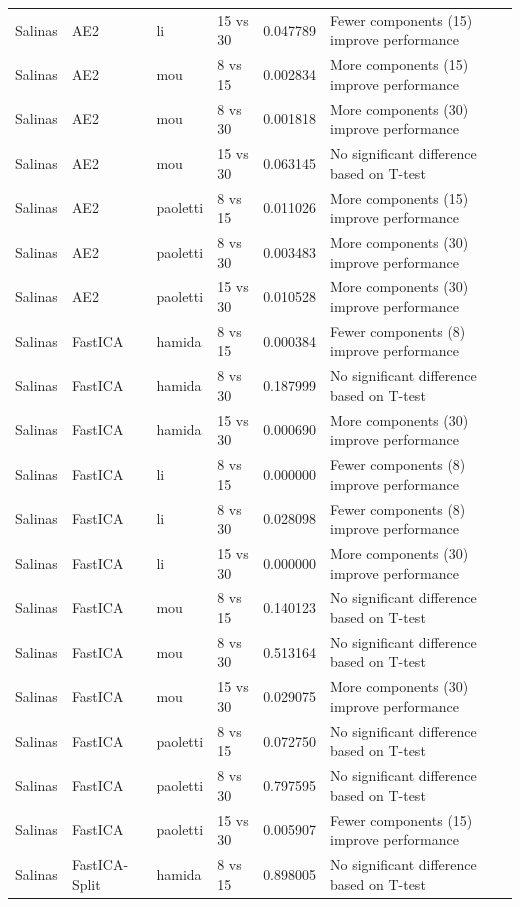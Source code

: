 \begin{longtable}{llllrl}
Salinas & AE2 & li & 15 vs 30 & 0.047789 & Fewer components (15) improve performance \\
Salinas & AE2 & mou & 8 vs 15 & 0.002834 & More components (15) improve performance \\
Salinas & AE2 & mou & 8 vs 30 & 0.001818 & More components (30) improve performance \\
Salinas & AE2 & mou & 15 vs 30 & 0.063145 & No significant difference based on T-test \\
Salinas & AE2 & paoletti & 8 vs 15 & 0.011026 & More components (15) improve performance \\
Salinas & AE2 & paoletti & 8 vs 30 & 0.003483 & More components (30) improve performance \\
Salinas & AE2 & paoletti & 15 vs 30 & 0.010528 & More components (30) improve performance \\
Salinas & FastICA & hamida & 8 vs 15 & 0.000384 & Fewer components (8) improve performance \\
Salinas & FastICA & hamida & 8 vs 30 & 0.187999 & No significant difference based on T-test \\
Salinas & FastICA & hamida & 15 vs 30 & 0.000690 & More components (30) improve performance \\
Salinas & FastICA & li & 8 vs 15 & 0.000000 & Fewer components (8) improve performance \\
Salinas & FastICA & li & 8 vs 30 & 0.028098 & Fewer components (8) improve performance \\
Salinas & FastICA & li & 15 vs 30 & 0.000000 & More components (30) improve performance \\
Salinas & FastICA & mou & 8 vs 15 & 0.140123 & No significant difference based on T-test \\
Salinas & FastICA & mou & 8 vs 30 & 0.513164 & No significant difference based on T-test \\
Salinas & FastICA & mou & 15 vs 30 & 0.029075 & More components (30) improve performance \\
Salinas & FastICA & paoletti & 8 vs 15 & 0.072750 & No significant difference based on T-test \\
Salinas & FastICA & paoletti & 8 vs 30 & 0.797595 & No significant difference based on T-test \\
Salinas & FastICA & paoletti & 15 vs 30 & 0.005907 & Fewer components (15) improve performance \\
Salinas & FastICA-Split & hamida & 8 vs 15 & 0.898005 & No significant difference based on T-test \\

\end{longtable}

